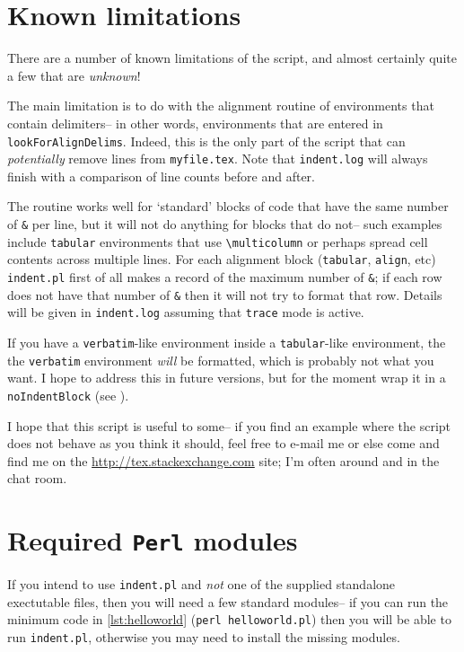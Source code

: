 \section{Known limitations}\label{sec:knownlimitations}
There are a number of known limitations of the script, and almost certainly quite a
few that are \emph{unknown}!
      
The main limitation is to do with the alignment routine of environments that contain 
delimiters-- in other words, environments that are entered in \lstinline!lookForAlignDelims!.
Indeed, this is the only part of the script that can \emph{potentially} remove 
lines from \lstinline!myfile.tex!. Note that \lstinline!indent.log! will always
finish with a comparison of line counts before and after. 
      
The routine works well for `standard' blocks of code that have the same number of \lstinline!&!
per line, but it will not do anything for blocks that do not-- such examples 
include \lstinline!tabular! environments that use \lstinline!\multicolumn! or 
perhaps spread cell contents across multiple lines.  For each alignment block (\lstinline!tabular!, 
\lstinline!align!, etc) \lstinline!indent.pl! first of all makes a record 
of the maximum number of \lstinline!&!; if each row does not have that 
number of \lstinline!&! then it will not try to format that row. Details 
will be given in \lstinline!indent.log! assuming that \lstinline!trace! mode
is active.

If you have a \lstinline!verbatim!-like environment inside a \lstinline!tabular!-like
environment, the the \lstinline!verbatim! environment \emph{will} be formatted, which 
is probably not what you want. I hope to address this in future versions, but for the 
moment wrap it in a \lstinline!noIndentBlock! (see ).
      
I hope that this script is useful to some-- if you find an example where the 
script does not behave as you think it should, feel free to e-mail me or else
come and find me on the \url{http://tex.stackexchange.com} site; I'm often around 
and in the chat room.
      
\printbibliography[heading=bibintoc]

\appendix
\section{Required \lstinline!Perl! modules}\label{sec:requiredmodules}
If you intend to use \lstinline!indent.pl! and \emph{not} one of the supplied standalone exectutable files, then you will need a few standard modules-- if you can run the 
minimum code in \cref{lst:helloworld} (\lstinline!perl helloworld.pl!) then you will be able to run \lstinline!indent.pl!, otherwise you may 
need to install the missing modules.
 	 	 	 	 	
